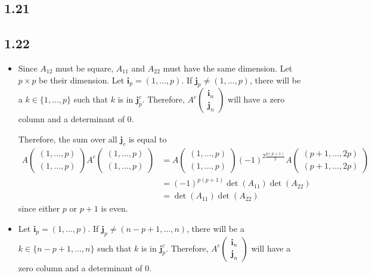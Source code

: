 \subsection*{1.21}
\nosolution

\subsection*{1.22}
\begin{solution}
  \begin{itemize}
    \item
      Since $A_{12}$ must be square,
      $A_{11}$ and $A_{22}$ must have the same dimension.
      Let $p \times p$ be their dimension.
      Let $\mathbf{i}_p = (1, \ldots, p)$.
      If $\mathbf{j}_p \neq (1, \ldots, p)$,
      there will be a $k \in \{1, \ldots, p\}$ such that
      $k$ is in $\mathbf{j}_p^c$.
      Therefore,
      \(
      A^c
      \begin{pmatrix}
        \mathbf{i}_n\\
        \mathbf{j}_n
      \end{pmatrix}
      \)
      will have a zero column and a determinant of 0.

      Therefore, the sum over all $\mathbf{j}_c$
      is equal to
      \begin{align*}
        A
        \begin{pmatrix}
          (1, \ldots, p)\\
          (1, \ldots, p)
        \end{pmatrix}
        A^c
        \begin{pmatrix}
          (1, \ldots, p)\\
          (1, \ldots, p)
        \end{pmatrix}
        & = A
        \begin{pmatrix}
          (1, \ldots, p)\\
          (1, \ldots, p)
        \end{pmatrix}
        (-1)^{2\frac{p(p+1)}{2}}
        A
        \begin{pmatrix}
          (p+1, \ldots, 2p)\\
          (p+1, \ldots, 2p)
        \end{pmatrix}\\
        & = (-1)^{p(p+1)}\det(A_{11}) \det(A_{22})\\
        & = \det(A_{11}) \det(A_{22})
      \end{align*}
      since either $p$ or $p+1$ is even.
    \item
      Let $\mathbf{i}_p = (1, \ldots, p)$.
      If $\mathbf{j}_p \neq (n-p+1, \ldots, n)$,
      there will be a $k \in \{n-p+1, \ldots, n\}$ such that
      $k$ is in $\mathbf{j}_p^c$.
      Therefore,
      \(
      A^c
      \begin{pmatrix}
        \mathbf{i}_n\\
        \mathbf{j}_n
      \end{pmatrix}
      \)
      will have a zero column and a determinant of 0.


\end{itemize}
\end{solution}
